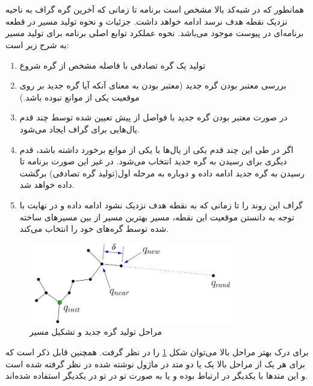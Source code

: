 \section*{}
\begin{latin}
	
\end{latin}

همانطور که در شبه‌کد بالا مشخص است برنامه تا زمانی که آخرین گره گراف به ناحیه نزدیک نقطه هدف نرسد ادامه خواهد داشت. جزئیات و نحوه تولید مسیر در قطعه برنامه‌ای در پیوست موجود می‌باشد. نحوه عملکرد توابع اصلی برنامه برای تولید مسیر به شرح زیر است:
\begin{enumerate}
	\item
	تولید یک گره تصادفی با فاصله مشخص از گره شروع
	\item
	بررسی معتبر بودن گره جدید (معتبر بودن به معنای آنکه آیا گره جدید بر روی موقعیت یکی از موانع نبوده باشد.)
	\item
	در صورت معتبر بودن گره جدید با فواصل از پیش تعیین شده توسط چند قدم یال‌هایی برای گراف ایجاد می‌شود.
	\item
	اگر در طی این چند قدم یکی از یال‌ها با یکی از موانع برخورد داشته باشد، قدم دیگری برای رسیدن به گره جدید انتخاب می‌شود. در غیر این صورت برنامه تا رسیدن به گره جدید ادامه داده و دوباره به مرحله اول(تولید گره تصادفی) برگشت داده خواهد شد.
	\item
	گراف این روند را تا زمانی که به نقطه هدف نزدیک نشود ادامه داده و در نهایت با توجه به دانستن موقعیت این نقطه، مسیر بهترین مسیر از بین مسیر‌های ساخته شده توسط گره‌های خود را انتخاب می‌کند.
\end{enumerate}

\begin{figure}[H]
	\centering
	\includegraphics[width=0.8\textwidth]{./images/Chapter2/NewNodeSteps_without_background}	
	\caption[مراحل تولید گره جدید و تشکیل مسیر]{مراحل تولید گره جدید و تشکیل مسیر\cite{Algobotics}}
	\label{مراحل تولید گره جدید}
\end{figure}
\noindent
\unskip

برای درک بهتر مراحل بالا می‌توان شکل
\ref{مراحل تولید گره جدید}
را در نظر گرفت. همچنین قابل ذکر است که برای هر یک از مراحل بالا یک یا دو متد
\noindent\unskip{}
در ماژول نوشته شده در نظر گرفته شده است و این متد‌ها با یکدیگر در ارتباط بوده و یا به صورت تو در تو
 \noindent\unskip{}
در یکدیگر استفاده شده‌اند. 

